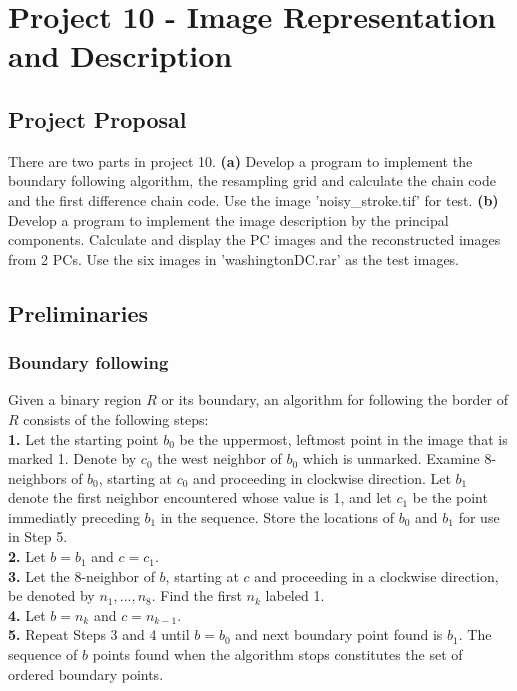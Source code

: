 \section{Project 10 - Image Representation and Description}
\subsection{Project Proposal}
There are two parts in project 10. 
\textbf{(a)} Develop a program to implement the boundary following algorithm, the resampling grid and calculate the chain code and the first difference chain code. Use the image 'noisy\_stroke.tif' for test. 
\textbf{(b)} Develop a program to implement the image description by the principal components. Calculate and display the PC images and the reconstructed images from 2 PCs. Use the six images in 'washingtonDC.rar' as the test images.

\subsection{Preliminaries}
\subsubsection{Boundary following}
Given a binary region $R$ or its boundary, an algorithm for following the border of $R$ consists of the following steps:\\
\textbf{1.} Let the starting point $b_0$ be the uppermost, leftmost point in the image that is marked 1. Denote by $c_0$ the west neighbor of $b_0$ which is unmarked. Examine 8-neighbors of $b_0$, starting at $c_0$ and proceeding in clockwise direction. Let $b_1$ denote the first neighbor encountered whose value is 1, and let $c_1$ be the point immediatly preceding $b_1$ in the sequence. Store the locations of $b_0$ and $b_1$ for use in Step 5.\\
\textbf{2.} Let $b=b_1$ and $c=c_1$.\\
\textbf{3.} Let the 8-neighbor of $b$, starting at $c$ and proceeding in a clockwise direction, be denoted by $n_1,...,n_8$. Find the first $n_k$ labeled 1.\\
\textbf{4.} Let $b=n_k$ and $c=n_{k-1}$.\\
\textbf{5.} Repeat Steps 3 and 4 until $b=b_0$ and next boundary point found is $b_1$. The sequence of $b$ points found when the algorithm stops constitutes the set of ordered boundary points.\\

